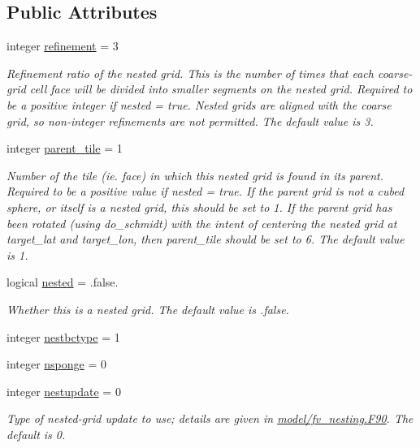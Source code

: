 \subsection*{Public Attributes}
\begin{DoxyCompactItemize}
\item 
integer \hyperlink{structfv__arrays__mod_1_1fv__nest__type_abd58583303d5bb884b9b12a981ff5134}{refinement} = 3
\begin{DoxyCompactList}\small\item\em Refinement ratio of the nested grid. This is the number of times that each coarse-\/grid cell face will be divided into smaller segments on the nested grid. Required to be a positive integer if nested = true. Nested grids are aligned with the coarse grid, so non-\/integer refinements are not permitted. The default value is 3. \end{DoxyCompactList}\item 
integer \hyperlink{structfv__arrays__mod_1_1fv__nest__type_aede3093421924ff4358cb95c28007329}{parent\-\_\-tile} = 1
\begin{DoxyCompactList}\small\item\em Number of the tile (ie. face) in which this nested grid is found in its parent. Required to be a positive value if nested = true. If the parent grid is not a cubed sphere, or itself is a nested grid, this should be set to 1. If the parent grid has been rotated (using do\-\_\-schmidt) with the intent of centering the nested grid at target\-\_\-lat and target\-\_\-lon, then parent\-\_\-tile should be set to 6. The default value is 1. \end{DoxyCompactList}\item 
logical \hyperlink{structfv__arrays__mod_1_1fv__nest__type_a8f685ad8b666aa48cd72b369a3d6f7cd}{nested} = .false.
\begin{DoxyCompactList}\small\item\em Whether this is a nested grid. The default value is .false. \end{DoxyCompactList}\item 
integer \hyperlink{structfv__arrays__mod_1_1fv__nest__type_adc7be956d3d3a5111c23c80548f87587}{nestbctype} = 1
\item 
integer \hyperlink{structfv__arrays__mod_1_1fv__nest__type_aeb2fa3b74f53464f55ad889e1532dae1}{nsponge} = 0
\item 
integer \hyperlink{structfv__arrays__mod_1_1fv__nest__type_af7ecd25821161fb9ee94fa569ce504f3}{nestupdate} = 0
\begin{DoxyCompactList}\small\item\em Type of nested-\/grid update to use; details are given in \hyperlink{fv__nesting_8F90}{model/fv\-\_\-nesting.\-F90}. The default is 0. \end{DoxyCompactList}\item 

\end{DoxyCompactItemize}
